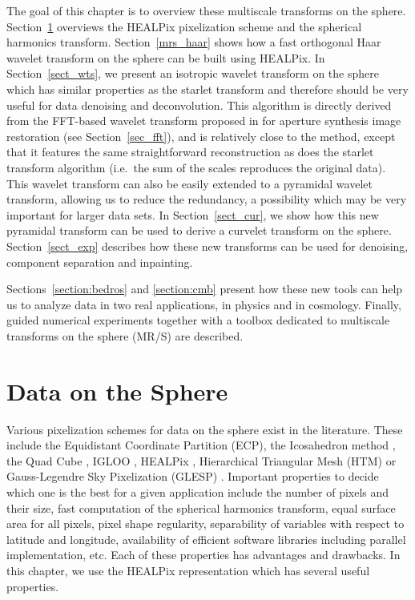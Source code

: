 The goal of this chapter is to overview these multiscale transforms on the sphere. Section~\ref{mrs_pixel} overviews the HEALPix pixelization scheme and the spherical harmonics transform. Section~\ref{mrs_haar} shows how a fast orthogonal Haar wavelet transform on the sphere can be built using HEALPix. In Section~\ref{sect_wts}, we present an isotropic wavelet transform on the sphere which has similar properties as the starlet transform and therefore should
be very useful for data denoising and deconvolution. This algorithm is directly derived from the FFT-based wavelet transform proposed in \citet{starck:sta94_3} for aperture synthesis image restoration (see Section~\ref{sec_fft}), and is relatively close to the \citet{freeden98} method, except that it features the same straightforward reconstruction as does the starlet transform algorithm (i.e.\ the sum of the scales reproduces the original data). This wavelet transform can also be easily extended to a pyramidal wavelet transform, allowing us to reduce the redundancy, a possibility which may be very important for larger data sets. In Section~\ref{sect_cur}, we show how this new pyramidal transform can be used to derive a curvelet transform on the sphere. Section~\ref{sect_exp} describes how these new transforms can be used for denoising, component separation and inpainting. 

Sections~\ref{section:bedros} and \ref{section:cmb} present how these new tools can help us to analyze data in two real applications, in physics and in cosmology. Finally, guided numerical experiments together with a toolbox dedicated to multiscale transforms on the sphere (MR/S) are described.
 
\section{Data on the Sphere}
\label{mrs_pixel}

Various pixelization schemes for data on the sphere exist in the literature. These include the Equidistant Coordinate Partition (ECP), the Icosahedron method  \citep{tegmark:icos1}, the Quad Cube \citep{white92}, IGLOO \citep{igloo}, HEALPix \citep{pixel:healpix}, Hierarchical Triangular Mesh (HTM) \citep{kunszt01} or Gauss-Legendre Sky Pixelization (GLESP) \citep{pixel:glesp}. Important properties to decide which one is the best for a given application include the number of pixels and their size, fast computation of the spherical harmonics transform, equal surface area for all pixels, pixel shape regularity, separability of variables with respect to latitude and longitude, availability of efficient software libraries including parallel implementation, etc. Each of these properties has advantages and drawbacks. In this chapter, we use the HEALPix representation which has several useful properties. 

